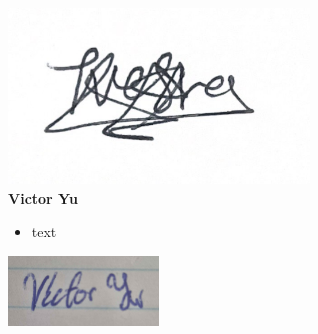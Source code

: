 \documentclass[]{article}
\numberwithin{figure}{section}
\begin{document}
\includegraphics[width=0.6\textwidth]{Tvesha.png}
\\
\textbf{Victor Yu}
\begin{itemize}
    \setlength\itemindent{2em}
    \item text
\end{itemize}
\includegraphics[width=0.3\textwidth]{Victor.png}
\end{document}
